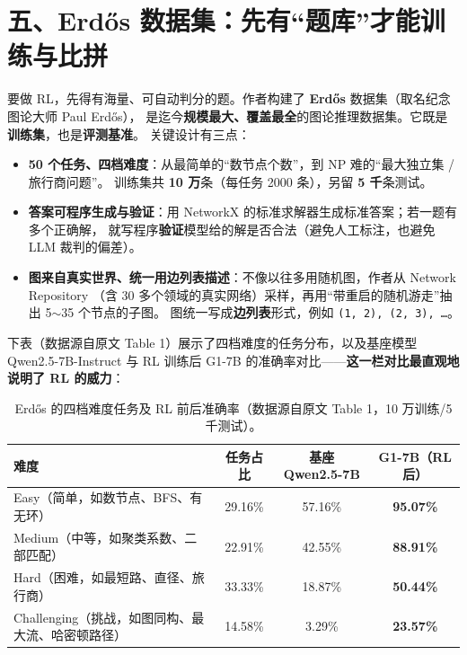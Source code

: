 \documentclass[11pt,UTF8,fontset=fandol]{ctexart}
\begin{document}
\section{五、Erdős 数据集：先有“题库”才能训练与比拼}

要做 RL，先得有海量、可自动判分的题。作者构建了 \textbf{Erdős} 数据集（取名纪念图论大师 Paul Erdős），
是迄今\textbf{规模最大、覆盖最全}的图论推理数据集。它既是\textbf{训练集}，也是\textbf{评测基准}。
关键设计有三点：

\begin{itemize}[leftmargin=2em]
  \item \textbf{50 个任务、四档难度}：从最简单的“数节点个数”，到 NP 难的“最大独立集 / 旅行商问题”。
        训练集共 \textbf{10 万}条（每任务 2000 条），另留 \textbf{5 千}条测试。
  \item \textbf{答案可程序生成与验证}：用 NetworkX 的标准求解器生成标准答案；若一题有多个正确解，
        就写程序\textbf{验证}模型给的解是否合法（避免人工标注，也避免 LLM 裁判的偏差）。
  \item \textbf{图来自真实世界、统一用边列表描述}：不像以往多用随机图，作者从 Network Repository
        （含 30 多个领域的真实网络）采样，再用“带重启的随机游走”抽出 5$\sim$35 个节点的子图。
        图统一写成\textbf{边列表}形式，例如 \texttt{(1, 2), (2, 3), \dots}。
\end{itemize}

下表（数据源自原文 Table 1）展示了四档难度的任务分布，以及基座模型 Qwen2.5-7B-Instruct 与
RL 训练后 G1-7B 的准确率对比——\textbf{这一栏对比最直观地说明了 RL 的威力}：

\begin{table}[H]\centering
\caption{Erdős 的四档难度任务及 RL 前后准确率（数据源自原文 Table 1，10 万训练/5 千测试）。}
\begin{tabular}{lccc}
\toprule
\textbf{难度} & \textbf{任务占比} & \textbf{基座 Qwen2.5-7B} & \textbf{G1-7B（RL 后）} \\
\midrule
Easy（简单，如数节点、BFS、有无环）        & 29.16\% & 57.16\% & \textbf{95.07\%} \\
Medium（中等，如聚类系数、二部匹配）       & 22.91\% & 42.55\% & \textbf{88.91\%} \\
Hard（困难，如最短路、直径、旅行商）        & 33.33\% & 18.87\% & \textbf{50.44\%} \\
Challenging（挑战，如图同构、最大流、哈密顿路径）& 14.58\% & \phantom{0}3.29\% & \textbf{23.57\%} \\
\bottomrule
\end{tabular}
\end{table}
\end{document}
